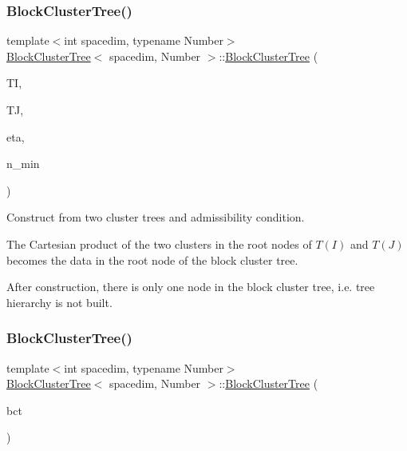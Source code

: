 \subsubsection{\texorpdfstring{Block\+Cluster\+Tree()}{BlockClusterTree()}\hspace{0.1cm}{\footnotesize\ttfamily [6/8]}}
{\footnotesize\ttfamily template$<$int spacedim, typename Number$>$ \\
\hyperlink{classBlockClusterTree}{Block\+Cluster\+Tree}$<$ spacedim, Number $>$\+::\hyperlink{classBlockClusterTree}{Block\+Cluster\+Tree} (\begin{DoxyParamCaption}\item[{const \hyperlink{classClusterTree}{Cluster\+Tree}$<$ spacedim, Number $>$ \&}]{TI,  }\item[{const \hyperlink{classClusterTree}{Cluster\+Tree}$<$ spacedim, Number $>$ \&}]{TJ,  }\item[{const Number}]{eta,  }\item[{const unsigned int}]{n\+\_\+min }\end{DoxyParamCaption})}

Construct from two cluster trees and admissibility condition.

The Cartesian product of the two clusters in the root nodes of $T(I)$ and $T(J)$ becomes the data in the root node of the block cluster tree.

After construction, there is only one node in the block cluster tree, i.\+e. tree hierarchy is not built. \mbox{\label{classBlockClusterTree_a1c31aecfd91383f8b96601fd2b63dd62}} 
\subsubsection{\texorpdfstring{Block\+Cluster\+Tree()}{BlockClusterTree()}\hspace{0.1cm}{\footnotesize\ttfamily [7/8]}}
{\footnotesize\ttfamily template$<$int spacedim, typename Number$>$ \\
\hyperlink{classBlockClusterTree}{Block\+Cluster\+Tree}$<$ spacedim, Number $>$\+::\hyperlink{classBlockClusterTree}{Block\+Cluster\+Tree} (\begin{DoxyParamCaption}\item[{const \hyperlink{classBlockClusterTree}{Block\+Cluster\+Tree}$<$ spacedim, Number $>$ \&}]{bct }\end{DoxyParamCaption})}

